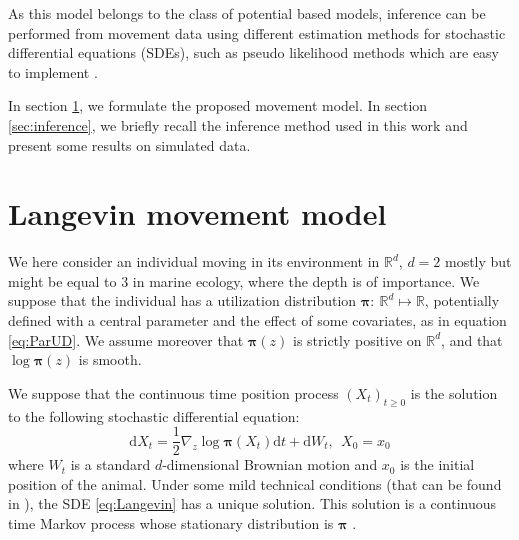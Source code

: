 \documentclass[10pt,a4paper]{article}
\newcommand{\rmd}{\text{d}}
\newcommand{\ud}{\boldsymbol{\pi}}
\begin{document}
As this model belongs to the class of potential based models, inference can be performed from movement data using different estimation methods for stochastic differential equations (SDEs), such as pseudo likelihood methods which are easy to implement \citep{gloaguen2017stochastic}.

In section \ref{sec:model}, we formulate the proposed movement model. In section \ref{sec:inference}, we briefly recall the inference method used in this work and present some results on simulated data.
\section{Langevin movement model}
\label{sec:model}

We here consider an individual moving in its environment in $\mathbb{R}^d$, $d=2$ mostly but might be equal to $3$ in marine ecology, where the depth is of importance. We suppose that the individual has a utilization distribution $\ud:~\mathbb{R}^d  \mapsto  \mathbb{R}$, potentially defined with a central parameter and  the effect of some covariates, as in equation \eqref{eq:ParUD}. We assume moreover that $\ud(z)$ is strictly positive on $\mathbb{R}^d$, and that $\log \ud(z)$ is smooth.

We suppose that the continuous time position process $(X_t)_{t\geq 0}$ is the solution to the following stochastic differential equation:
\begin{equation}
\label{eq:Langevin}
\rmd X_t = \frac{1}{2}\nabla_z \log \ud(X_t) \rmd t + \rmd W_t,~~X_0 = x_0
\end{equation}
where $W_t$ is a standard $d$-dimensional Brownian motion and $x_0$ is the initial position of the animal. Under some mild technical conditions (that can be found in \citet{dalalyan2017theoretical}), the SDE  \eqref{eq:Langevin} has a unique solution. This solution is a continuous time Markov process whose stationary distribution is $\ud$ \citep{roberts1996exponential}. 
\end{document}
